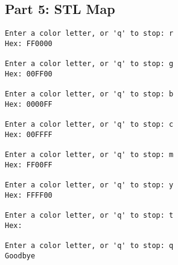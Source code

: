     \subsection{Part 5: STL Map}

\begin{lstlisting}[style=output]
Enter a color letter, or 'q' to stop: r
Hex: FF0000

Enter a color letter, or 'q' to stop: g
Hex: 00FF00

Enter a color letter, or 'q' to stop: b
Hex: 0000FF

Enter a color letter, or 'q' to stop: c
Hex: 00FFFF

Enter a color letter, or 'q' to stop: m
Hex: FF00FF

Enter a color letter, or 'q' to stop: y
Hex: FFFF00

Enter a color letter, or 'q' to stop: t
Hex: 

Enter a color letter, or 'q' to stop: q
Goodbye
\end{lstlisting}
    


